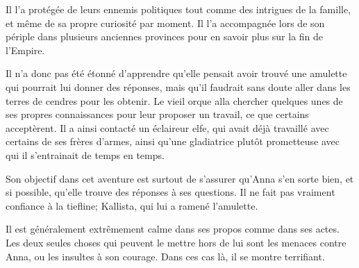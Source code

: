 \documentclass[10pt,a4paper]{article}
\begin{document}
Il l'a protégée de leurs ennemis politiques tout comme des intrigues de la famille, et même de sa propre curiosité par moment. Il l'a accompagnée lors de son périple dans plusieurs anciennes provinces pour en savoir plus sur la fin de l'Empire.

Il n'a donc pas été étonné d'apprendre qu'elle pensait avoir trouvé une amulette qui pourrait lui donner des réponses, mais qu'il faudrait sans doute aller dans les terres de cendres pour les obtenir. Le vieil orque alla chercher quelques unes de ses propres connaissances pour leur proposer un travail, ce que certains acceptèrent. Il a ainsi contacté un éclaireur elfe, qui avait déjà travaillé avec certains de ses frères d'armes, ainsi qu'une gladiatrice plutôt prometteuse avec qui il s'entrainait de temps en temps.

Son objectif dans cet aventure est surtout de s'assurer qu'Anna s'en sorte bien, et si possible, qu'elle trouve des réponses à ses questions. Il ne fait pas vraiment confiance à la tiefline; Kallista, qui lui a ramené l'amulette.

Il est généralement extrêmement calme dans ses propos comme dans ses actes. Les deux seules choses qui peuvent le mettre hors de lui sont les menaces contre Anna, ou les insultes à son courage. Dans ces cas là, il se montre terrifiant.
\end{document}
